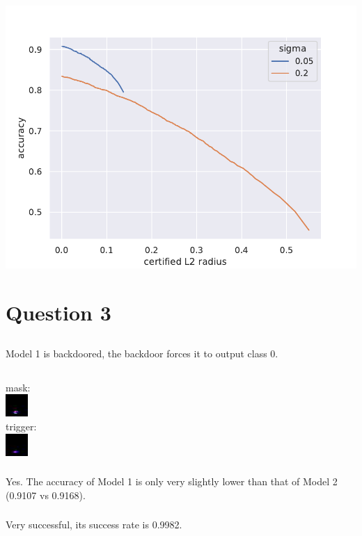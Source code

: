 \documentclass{article}
\begin{document}
\subsection{}
\includegraphics[scale=0.7]{randomized-smoothing-acc-vs-radius.pdf}

\section{Question 3}
\setcounter{subsection}{1}
\subsection{}
Model 1 is backdoored, the backdoor forces it to output class 0.
\subsection{}
\subsubsection{}
mask: \\
\includegraphics[scale=2]{backdoor-mask.jpg} \\
trigger: \\
\includegraphics[scale=2]{backdoor-trigger.jpg}
\subsubsection{}
Yes. The accuracy of Model 1 is only very slightly lower than that of Model 2 (0.9107 vs 0.9168).
\subsubsection{}
Very successful, its success rate is 0.9982.
\end{document}

